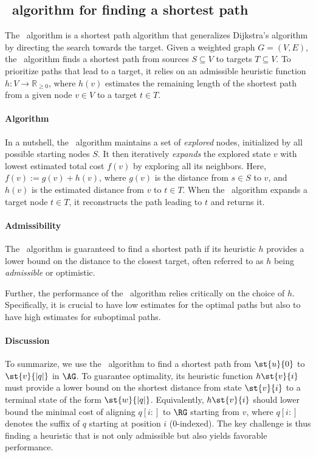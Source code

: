 \subsection{\A~algorithm for finding a shortest path} \label{sec:astar}
%
The \A~algorithm is a shortest path algorithm that generalizes Dijkstra's
algorithm by directing the search towards the target.
Given a weighted graph $G=(V,E)$, the \A~algorithm finds a shortest path from
sources $S \subseteq V$ to targets $T \subseteq V$.
%
To prioritize paths that lead to a target, it relies on an admissible heuristic
function $h \colon V \to \mathbb{R}_{\geq 0}$, where $h(v)$ estimates the
remaining length of the shortest path from a given node $v \in V$ to a target
$t \in T$.


\paragraph{Algorithm}
% 
In a nutshell, the \A~algorithm maintains a set of \emph{explored} nodes,
initialized by all possible starting nodes $S$. It then iteratively
\emph{expands} the explored state $v$ with lowest estimated total cost $f(v)$ by
exploring all its neighbors. Here, $f(v) := g(v) + h(v)$, where $g(v)$ is the
distance from $s \in S$ to $v$, and $h(v)$ is the estimated distance from $v$ to
$t \in T$.
%
When the \A~algorithm expands a target node $t \in T$, it reconstructs the path
leading to $t$ and returns it.
%

\paragraph{Admissibility}
%
The \A~algorithm is guaranteed to find a shortest path if its heuristic $h$
provides a lower bound on the distance to the closest target, often referred to
as $h$ being \emph{admissible} or optimistic.

Further, the performance of the \A~algorithm relies critically on the choice of
$h$. Specifically, it is crucial to have low estimates for the optimal paths but
also to have high estimates for suboptimal paths.

\paragraph{Discussion}
%
To summarize, we use the \A~algorithm to find a shortest path from $\st{u}{0}$
to $\st{v}{|q|}$ in $\AG$. To guarantee optimality, its heuristic function
$h\st{v}{i}$ must provide a lower bound on the shortest distance from state
$\st{v}{i}$ to a terminal state of the form $\st{w}{\lvert q \rvert}$.
%
Equivalently, $h\st{v}{i}$ should lower bound the minimal cost of aligning
$q[i{:}]$ to $\RG$ starting from $v$, where $q[i{:}]$ denotes the suffix of $q$
starting at position $i$ ($0$-indexed).
%
The key challenge is thus finding a heuristic that is not only admissible but
also yields favorable performance.